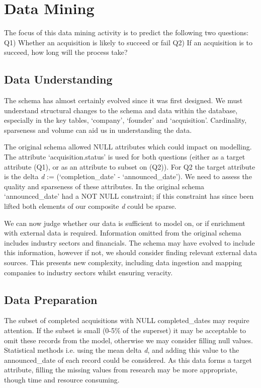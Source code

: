 \documentclass[12pt]{article}
\begin{document}
\section {Data Mining}

The focus of this data mining activity is to predict the following two questions: Q1) Whether an acquisition is likely to succeed or fail Q2) If an acquisition is to succeed, how long will the process take?

 \subsection{Data Understanding}
The schema has almost certainly evolved since it was first designed. We must understand structural changes to the schema and data within the database, especially in the key tables, `company', `founder' and `acquisition'. Cardinality, sparseness and volume can aid us in understanding the data.

The original schema allowed NULL attributes which could impact on modelling. The attribute `acquisition.status' is used for both questions (either as a target attribute (Q1), or as an attribute to subset on (Q2)). For Q2 the target attribute is the delta \emph{d} := (`completion\_date' - `announced\_date').  We need to assess the quality and sparseness of these attributes. In the original schema `announced\_date' had a NOT NULL constraint; if this constraint has since been lifted both elements of our composite \emph{d} could be sparse.

We can now judge whether our data is sufficient to model on, or if enrichment with external data is required. Information omitted from the original schema includes industry sectors and financials. The schema may have evolved to include this information, however if not, we should consider finding relevant external data sources. This presents new complexity, including data ingestion and mapping companies to industry sectors whilst ensuring veracity.

 \subsection{Data Preparation}
The subset of completed acquisitions with NULL completed\_dates may require attention. If the subset is small (0-5\% of the superset) it may be acceptable to omit these records from the model, otherwise we may consider filling null values. Statistical methods i.e. using the mean delta \emph{d}, and adding this value to the announced\_date of each record could be considered. As this data forms a target attribute, filling the missing values from research may be more appropriate, though time and resource consuming.
\end{document}
